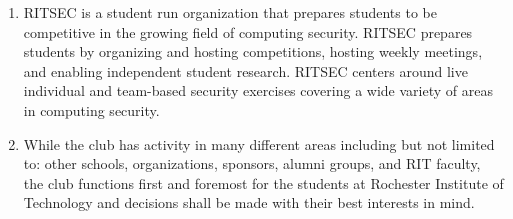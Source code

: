 

\begin{enumerate}
  \item RITSEC is a student run organization that prepares students to be
    competitive in the growing field of computing security. RITSEC prepares
    students by organizing and hosting competitions, hosting weekly meetings,
    and enabling independent student research. RITSEC centers around live
    individual and team-based security exercises covering a wide variety of
    areas in computing security.
  \item While the club has activity in many different areas including but not
    limited to: other schools, organizations, sponsors, alumni groups, and RIT
    faculty, the club functions first and foremost for the students at
    Rochester Institute of Technology and decisions shall be made with their
    best interests in mind.
\end{enumerate}